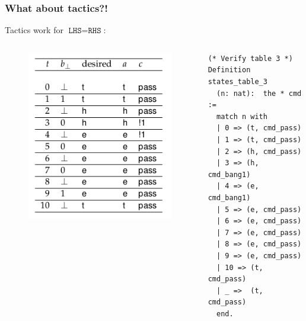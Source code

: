 \documentclass{beamer}
\begin{document}
\begin{frame}[fragile]
\frametitle{What about tactics?!}
\pause

Tactics work for $\texttt{LHS} = \texttt{RHS}$:
\pause

\begin{columns}[T] %
\begin{column}{.25\textwidth}
\begin{figure}
\centering
\includegraphics[width=\textwidth]{table-3.png}
\end{figure}
\end{column}
\begin{column}{.3\textwidth}
{\fontsize{2.5}{4}\selectfont
\begin{verbatim}
(* Verify table 3 *)
Definition states_table_3
  (n: nat):  the * cmd :=
  match n with
  | 0 => (t, cmd_pass)
  | 1 => (t, cmd_pass)
  | 2 => (h, cmd_pass)
  | 3 => (h, cmd_bang1)
  | 4 => (e, cmd_bang1) 
  | 5 => (e, cmd_pass) 
  | 6 => (e, cmd_pass) 
  | 7 => (e, cmd_pass) 
  | 8 => (e, cmd_pass) 
  | 9 => (e, cmd_pass) 
  | 10 => (t, cmd_pass) 
  | _ =>  (t, cmd_pass)
  end.
 \end{verbatim}
 }

\end{column}
\end{columns}
\end{frame}
\end{document}
